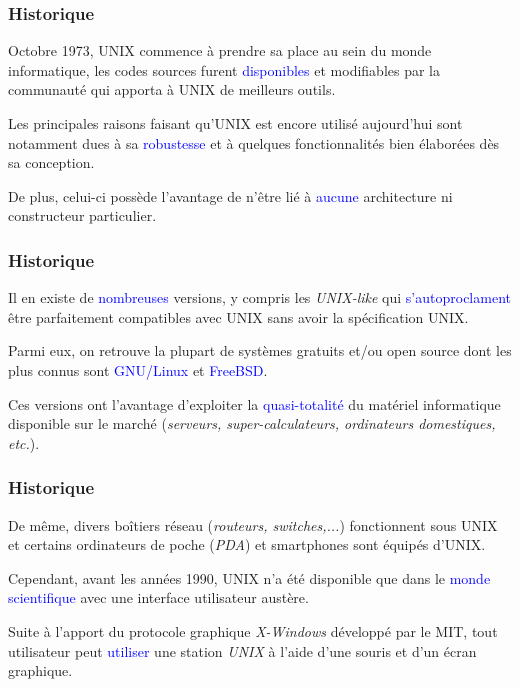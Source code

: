 \documentclass[aspectratio=169]{beamer}
\begin{document}
\begin{frame}
  \frametitle{Historique}
  Octobre 1973, UNIX commence à prendre sa place au sein du monde informatique,
  les codes sources furent \textcolor{blue}{disponibles} et modifiables par la
  communauté qui apporta à UNIX de meilleurs outils.

\hspace{0.5cm}

Les principales raisons faisant qu'UNIX est encore utilisé aujourd'hui sont
notamment dues à sa \textcolor{blue}{robustesse} et à quelques fonctionnalités
bien élaborées dès sa conception.

\hspace{0.5cm}

De plus, celui-ci possède l'avantage de n'être lié à \textcolor{blue}{aucune}
architecture ni constructeur particulier.
\end{frame}

\begin{frame}
  \frametitle{Historique}
  Il en existe de \textcolor{blue}{nombreuses} versions, y compris les
  \textit{UNIX-like} qui \textcolor{blue}{s'autoproclament} être parfaitement
  compatibles avec UNIX sans avoir la spécification UNIX.

\hspace{0.5cm}

Parmi eux, on retrouve la plupart de systèmes gratuits et/ou open source dont
les plus connus sont \textcolor{blue}{GNU/Linux} et \textcolor{blue}{FreeBSD}.

\hspace{0.5cm}

Ces versions ont l'avantage d'exploiter la \textcolor{blue}{quasi-totalité} du
matériel informatique disponible sur le marché (\textit{serveurs,
super-calculateurs, ordinateurs domestiques, etc.}).
\end{frame}

\begin{frame}
  \frametitle{Historique}
  De même, divers boîtiers réseau (\textit{routeurs, switches,...}) fonctionnent
  sous UNIX et certains ordinateurs de poche (\textit{PDA}) et smartphones sont
  équipés d'UNIX.

\hspace{0.5cm}

Cependant, avant les années 1990, UNIX n'a été disponible que dans le
\textcolor{blue}{monde scientifique} avec une interface utilisateur austère.

\hspace{0.5cm}

Suite à l'apport du protocole graphique \textit{X-Windows} développé par le MIT, tout
utilisateur peut \textcolor{blue}{utiliser} une station \textit{UNIX} à l'aide d'une
souris et d'un écran graphique.
\end{frame}
\end{document}
